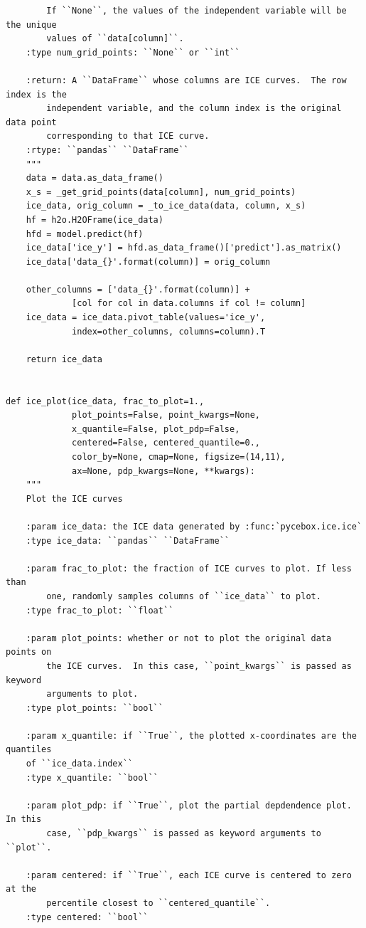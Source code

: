 \documentclass{article}
\begin{document}
\begin{lstlisting}
        If ``None``, the values of the independent variable will be the unique
        values of ``data[column]``.
    :type num_grid_points: ``None`` or ``int``

    :return: A ``DataFrame`` whose columns are ICE curves.  The row index is the
        independent variable, and the column index is the original data point
        corresponding to that ICE curve.
    :rtype: ``pandas`` ``DataFrame``
    """
    data = data.as_data_frame()
    x_s = _get_grid_points(data[column], num_grid_points)
    ice_data, orig_column = _to_ice_data(data, column, x_s)
    hf = h2o.H2OFrame(ice_data)
    hfd = model.predict(hf)
    ice_data['ice_y'] = hfd.as_data_frame()['predict'].as_matrix()
    ice_data['data_{}'.format(column)] = orig_column

    other_columns = ['data_{}'.format(column)] + 
             [col for col in data.columns if col != column]
    ice_data = ice_data.pivot_table(values='ice_y', 
             index=other_columns, columns=column).T

    return ice_data


def ice_plot(ice_data, frac_to_plot=1.,
             plot_points=False, point_kwargs=None,
             x_quantile=False, plot_pdp=False,
             centered=False, centered_quantile=0.,
             color_by=None, cmap=None, figsize=(14,11),
             ax=None, pdp_kwargs=None, **kwargs):
    """
    Plot the ICE curves

    :param ice_data: the ICE data generated by :func:`pycebox.ice.ice`
    :type ice_data: ``pandas`` ``DataFrame``

    :param frac_to_plot: the fraction of ICE curves to plot. If less than 
        one, randomly samples columns of ``ice_data`` to plot.
    :type frac_to_plot: ``float``

    :param plot_points: whether or not to plot the original data points on
        the ICE curves.  In this case, ``point_kwargs`` is passed as keyword
        arguments to plot.
    :type plot_points: ``bool``

    :param x_quantile: if ``True``, the plotted x-coordinates are the quantiles 
    of ``ice_data.index``
    :type x_quantile: ``bool``

    :param plot_pdp: if ``True``, plot the partial depdendence plot.  In this
        case, ``pdp_kwargs`` is passed as keyword arguments to ``plot``.

    :param centered: if ``True``, each ICE curve is centered to zero at the
        percentile closest to ``centered_quantile``.
    :type centered: ``bool``


\end{lstlisting}
\end{document}
